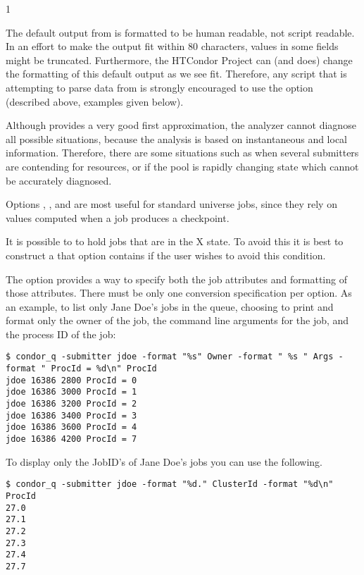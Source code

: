 \begin{ManPage}{\label{man-condor-q}}{1}
\GenRem

The default output from  is formatted to be human readable,
not script readable.
In an effort to make the output fit within 80 characters, values in
some fields might be truncated.
Furthermore, the HTCondor Project can (and does) change the formatting
of this default output as we see fit.
Therefore, any script that is attempting to parse data from 
is strongly encouraged to use the  option (described
above, examples given below).

Although  provides a very good first approximation, the analyzer 
cannot diagnose all possible situations,
because the analysis is based on 
instantaneous and local information.  Therefore, there are some situations 
such as when several submitters are contending for resources, or if the pool 
is rapidly changing state which cannot be accurately diagnosed.

Options
, , and  are most useful for standard
universe jobs, since they rely on values computed when a job
produces a checkpoint.

It is possible to to hold jobs that are in the X state.
To avoid this it 
is best to construct a  that option contains
 if the user wishes to avoid this condition. 

\Examples


The  option provides a way to specify both the job attributes
and formatting of those attributes.
There must be only one conversion specification per  option.
As an example, to list only Jane Doe's jobs in the queue,
choosing to print and format only the owner of the job,
the command line arguments for the job, and the
process ID of the job:
\footnotesize
\begin{verbatim}
$ condor_q -submitter jdoe -format "%s" Owner -format " %s " Args -format " ProcId = %d\n" ProcId
jdoe 16386 2800 ProcId = 0
jdoe 16386 3000 ProcId = 1
jdoe 16386 3200 ProcId = 2
jdoe 16386 3400 ProcId = 3
jdoe 16386 3600 ProcId = 4
jdoe 16386 4200 ProcId = 7
\end{verbatim}
\normalsize

To display only the JobID's of Jane Doe's jobs you can use the following.
\footnotesize
\begin{verbatim}
$ condor_q -submitter jdoe -format "%d." ClusterId -format "%d\n" ProcId
27.0
27.1
27.2
27.3
27.4
27.7
\end{verbatim}
\normalsize


\end{ManPage}
